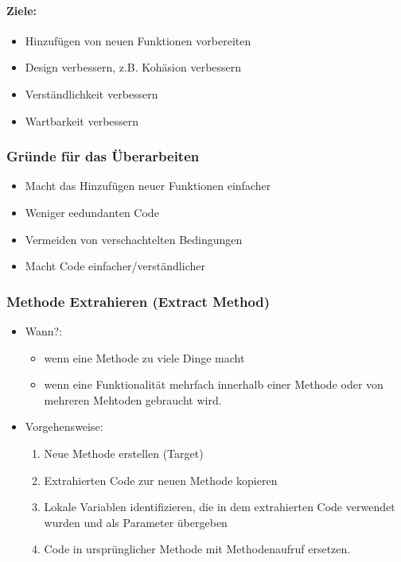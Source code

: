 \documentclass[
    ngerman,
    color=3b,
    summary,
    boxarc,
    main,
]{rubos-tuda-template}
\begin{document}
\paragraph{Ziele:}\begin{itemize}
    \item Hinzufügen von neuen Funktionen vorbereiten
    \item Design verbessern, z.B. Kohäsion verbessern
    \item Verständlichkeit verbessern
    \item Wartbarkeit verbessern
\end{itemize}
\subsubsection{Gründe für das Überarbeiten}
\begin{itemize}
    \item Macht das Hinzufügen neuer Funktionen einfacher
    \item Weniger eedundanten Code
    \item Vermeiden von verschachtelten Bedingungen
    \item Macht Code einfacher/verständlicher
\end{itemize}
\subsubsection{Methode Extrahieren (Extract Method)}
\begin{itemize}
    \item Wann?: \begin{itemize}
              \item wenn eine Methode zu viele Dinge macht
              \item wenn eine Funktionalität mehrfach innerhalb einer Methode oder von mehreren Mehtoden gebraucht wird.
          \end{itemize}
    \item Vorgehensweise:\begin{enumerate}
              \item Neue Methode erstellen (Target)
              \item Extrahierten Code zur neuen Methode kopieren
              \item Lokale Variablen identifizieren, die in dem extrahierten Code verwendet wurden und als Parameter übergeben
              \item Code in ursprünglicher Methode mit Methodenaufruf ersetzen.
          \end{enumerate}
\end{itemize}
\clearpage
\end{document}
